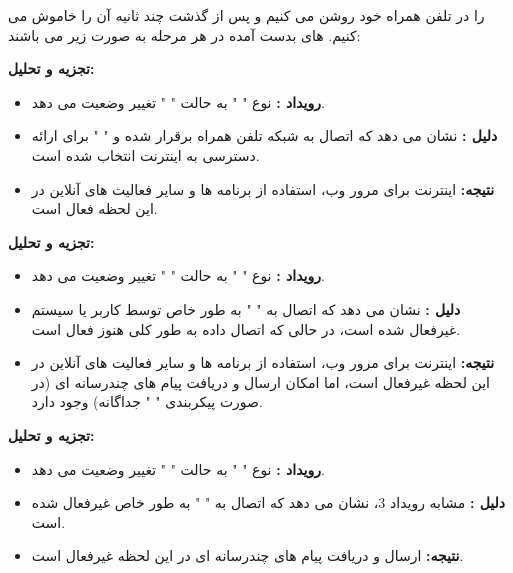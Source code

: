 \documentclass[landscape, 12pt]{report}
\begin{document}
را در تلفن همراه خود روشن می کنیم و پس از گذشت چند ثانیه آن را خاموش می کنیم. 
های بدست آمده در هر مرحله به صورت زیر می باشند:
\begin{latin}
	
	\label{code:state2}
\end{latin}
\textbf{تجزیه و تحلیل:}
\begin{itemize}
	\item
	\textbf{رویداد
		: }
	نوع "
	" به حالت "
	" تغییر وضعیت می دهد.
	\item
	\textbf{دلیل
		:}
	نشان می دهد که اتصال به شبکه تلفن همراه برقرار شده و
	 "
	" برای ارائه دسترسی به اینترنت انتخاب شده است.
	\item
	\textbf{نتیجه:}
	اینترنت برای مرور وب، استفاده از برنامه ها و سایر فعالیت های آنلاین در این لحظه فعال است.
\end{itemize}
\begin{latin}
	
	\label{code:state3}
\end{latin}
\textbf{تجزیه و تحلیل:}
\begin{itemize}
	\item
	\textbf{رویداد
		: }
	نوع "
	" به حالت "
	" تغییر وضعیت می دهد.
	\item
	\textbf{دلیل
		:}
	نشان می دهد که اتصال به 
	 "
	 "
	 به طور خاص توسط کاربر یا سیستم غیرفعال شده است، در حالی که اتصال داده به طور کلی هنوز فعال است.
	\item
	\textbf{نتیجه:}
	اینترنت برای مرور وب، استفاده از برنامه ها و سایر فعالیت های آنلاین در این لحظه غیرفعال است، اما امکان ارسال و دریافت پیام های چندرسانه ای (در صورت پیکربندی 
	 "
	" جداگانه) وجود دارد.
\end{itemize}
\begin{latin}
	
	\label{code:state4}
\end{latin}
\textbf{تجزیه و تحلیل:}
\begin{itemize}
	\item
	\textbf{رویداد
		: }
	نوع "
	" به حالت "
	" تغییر وضعیت می دهد.
	\item
	\textbf{دلیل
		:}
	مشابه رویداد 3، نشان می دهد که اتصال به 
	 "
	 " به طور خاص غیرفعال شده است.
	\item
	\textbf{نتیجه:}
	ارسال و دریافت پیام های چندرسانه ای در این لحظه غیرفعال است.
\end{itemize}
\end{document}
